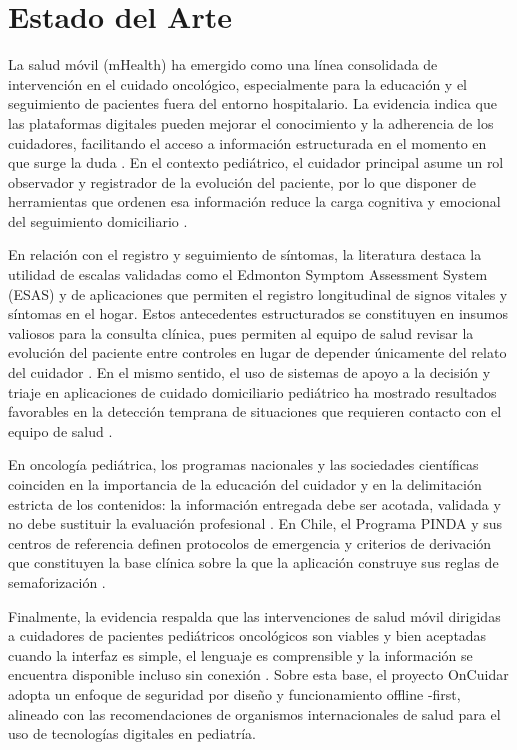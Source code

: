 \chapter{Estado del Arte}

La salud móvil (mHealth) ha emergido como una línea consolidada de intervención
en el cuidado oncológico, especialmente para la educación y el seguimiento de
pacientes fuera del entorno hospitalario. La evidencia indica que las
plataformas digitales pueden mejorar el conocimiento y la adherencia de los
cuidadores, facilitando el acceso a información estructurada en el momento en
que surge la duda \citep{nair_2017}. En el contexto pediátrico, el cuidador
principal asume un rol observador y registrador de la evolución del paciente,
por lo que disponer de herramientas que ordenen esa información reduce la carga
cognitiva y emocional del seguimiento domiciliario \citep{lewandowska_2022}.

En relación con el registro y seguimiento de síntomas, la literatura destaca la
utilidad de escalas validadas como el Edmonton Symptom Assessment System (ESAS)
y de aplicaciones que permiten el registro longitudinal de signos vitales y
síntomas en el hogar. Estos antecedentes estructurados se constituyen en
insumos valiosos para la consulta clínica, pues permiten al equipo de salud
revisar la evolución del paciente entre controles en lugar de depender
únicamente del relato del cuidador \citep{arnis_2024}. En el mismo sentido, el
uso de sistemas de apoyo a la decisión y triaje en aplicaciones de cuidado
domiciliario pediátrico ha mostrado resultados favorables en la detección
temprana de situaciones que requieren contacto con el equipo de salud
\citep{lau_2025}.

En oncología pediátrica, los programas nacionales y las sociedades científicas
coinciden en la importancia de la educación del cuidador y en la delimitación
estricta de los contenidos: la información entregada debe ser acotada, validada
y no debe sustituir la evaluación profesional \citep{minsal_sf,pohema_seop_sf}.
En Chile, el Programa PINDA y sus centros de referencia definen protocolos de
emergencia y criterios de derivación que constituyen la base clínica sobre la
que la aplicación construye sus reglas de semaforización
\citep{pinda_estadisticas_2026}.

Finalmente, la evidencia respalda que las intervenciones de salud móvil
dirigidas a cuidadores de pacientes pediátricos oncológicos son viables y bien
aceptadas cuando la interfaz es simple, el lenguaje es comprensible y la
información se encuentra disponible incluso sin conexión
\citep{paho_oms_sf,mskcc_sf,idsa_sf,aepap_sf}. Sobre esta base, el proyecto
OnCuidar adopta un enfoque de seguridad por diseño y funcionamiento offline
-first, alineado con las recomendaciones de organismos internacionales de salud
para el uso de tecnologías digitales en pediatría.